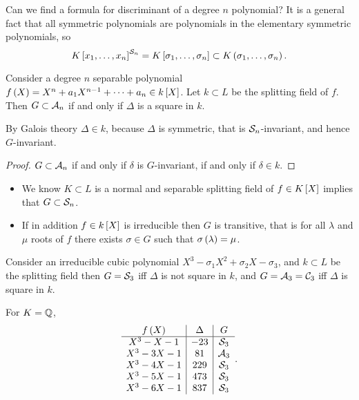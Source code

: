Can we find a formula for discriminant of a degree $ n $ polynomial? It is a general fact that all symmetric polynomials are polynomials in the elementary symmetric polynomials, so
$$ K\sbr{x_1, \dots, x_n}^{\SSS_n} = K\sbr{\sigma_1, \dots, \sigma_n} \subset K\br{\sigma_1, \dots, \sigma_n}. $$

\begin{theorem}
Consider a degree $ n $ separable polynomial $ f\br{X} = X^n + a_1X^{n - 1} + \dots + a_n \in k\sbr{X} $. Let $ k \subset L $ be the splitting field of $ f $. Then $ G \subset \mathcal{A}_n $ if and only if $ \Delta $ is a square in $ k $.
\end{theorem}

By Galois theory $ \Delta \in k $, because $ \Delta $ is symmetric, that is $ \mathcal{S}_n $-invariant, and hence $ G $-invariant.

\begin{proof}
$ G \subset \mathcal{A}_n $ if and only if $ \delta $ is $ G $-invariant, if and only if $ \delta \in k $.
\end{proof}

\begin{remark*}
\hfill
\begin{itemize}
\item We know $ K \subset L $ is a normal and separable splitting field of $ f \in K\sbr{X} $ implies that $ G \subset \mathcal{S}_n $.
\item If in addition $ f \in k\sbr{X} $ is irreducible then $ G $ is transitive, that is for all $ \lambda $ and $ \mu $ roots of $ f $ there exists $ \sigma \in G $ such that $ \sigma\br{\lambda} = \mu $.
\end{itemize}
\end{remark*}

\begin{theorem}
Consider an irreducible cubic polynomial $ X^3 - \sigma_1X^2 + \sigma_2X - \sigma_3 $, and $ k \subset L $ be the splitting field then $ G = \mathcal{S}_3 $ iff $ \Delta $ is not square in $ k $, and $ G = \mathcal{A}_3 = \mathcal{C}_3 $ iff $ \Delta $ is square in $ k $.
\end{theorem}

\begin{example*}
For $ K = \mathbb{Q} $,
$$
\begin{array}{c|c|c}
f\br{X} & \Delta & G \\
\hline
X^3 - X - 1 & -23 & \SSS_3 \\
X^3 - 3X - 1 & 81 & \AAA_3 \\
X^3 - 4X - 1 & 229 & \SSS_3 \\
X^3 - 5X - 1 & 473 & \SSS_3 \\
X^3 - 6X - 1 & 837 & \SSS_3
\end{array}.
$$
\end{example*}

